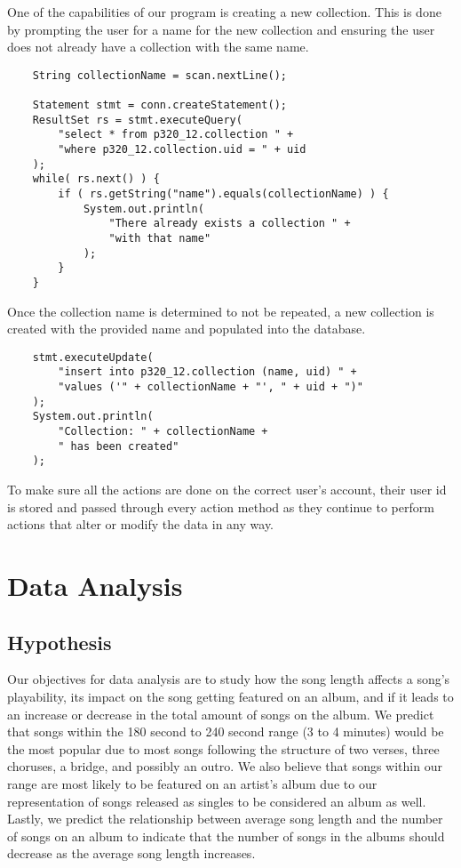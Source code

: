 \documentclass[12pt]{article}
\begin{document}
    One of the capabilities of our program is creating a new collection.
    This is done by prompting the user for a name for the new collection
    and ensuring the user does not already have a collection with the same
    name.
    \begin{lstlisting}
    String collectionName = scan.nextLine();

    Statement stmt = conn.createStatement();
    ResultSet rs = stmt.executeQuery(
        "select * from p320_12.collection " +
        "where p320_12.collection.uid = " + uid
    );
    while( rs.next() ) {
        if ( rs.getString("name").equals(collectionName) ) {
            System.out.println(
                "There already exists a collection " +
                "with that name"
            );
        }
    }
    \end{lstlisting}
    Once the collection name is determined to not be repeated, a new collection
    is created with the provided name and populated into the database.
    \begin{lstlisting}
    stmt.executeUpdate(
        "insert into p320_12.collection (name, uid) " +
        "values ('" + collectionName + "', " + uid + ")"
    );
    System.out.println(
        "Collection: " + collectionName +
        " has been created"
    );
    \end{lstlisting}
    To make sure all the actions are done on the correct user's account, their
    user id is stored and passed through every action method as they continue to perform
    actions that alter or modify the data in any way.



    \section{Data Analysis}
    
    
    \subsection{Hypothesis}

    Our objectives for data analysis are to study how the song length affects
    a song's playability, its impact on the song getting featured on an album,
    and if it leads to an increase or decrease in the total amount of songs on
    the album. We predict that songs within the 180 second to 240 second range
    (3 to 4 minutes)
    would be the most popular due to most songs following the structure of two
    verses, three choruses, a bridge, and possibly an outro. We also believe
    that songs within our range are most likely to be featured on an artist's
    album due to our representation of songs released as singles to be considered
    an album as well. Lastly, we predict the relationship between average song
    length and the number of songs on an album to indicate that the number of songs
    in the albums should decrease as the average song length increases.
\end{document}
